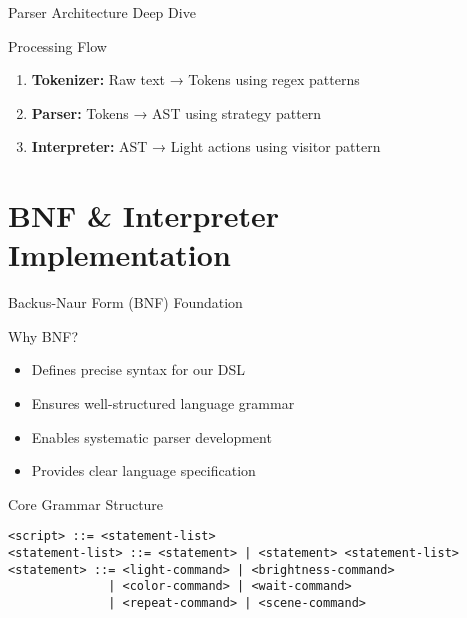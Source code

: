 \documentclass{beamer}
\begin{document}
\begin{frame}{Parser Architecture Deep Dive}
\begin{center}
\end{center}

\begin{block}{Processing Flow}
\begin{enumerate}
    \item \textbf{Tokenizer:} Raw text → Tokens using regex patterns
    \item \textbf{Parser:} Tokens → AST using strategy pattern
    \item \textbf{Interpreter:} AST → Light actions using visitor pattern
\end{enumerate}
\end{block}
\end{frame}


\section{BNF \& Interpreter Implementation}

\begin{frame}{Backus-Naur Form (BNF) Foundation}
\begin{block}{Why BNF?}
\begin{itemize}
    \item Defines precise syntax for our DSL
    \item Ensures well-structured language grammar
    \item Enables systematic parser development
    \item Provides clear language specification
\end{itemize}
\end{block}

\begin{block}{Core Grammar Structure}
\begin{lstlisting}[basicstyle=\tiny]
<script> ::= <statement-list>
<statement-list> ::= <statement> | <statement> <statement-list>
<statement> ::= <light-command> | <brightness-command> 
              | <color-command> | <wait-command> 
              | <repeat-command> | <scene-command>
\end{lstlisting}
\end{block}
\end{frame}
\end{document}
